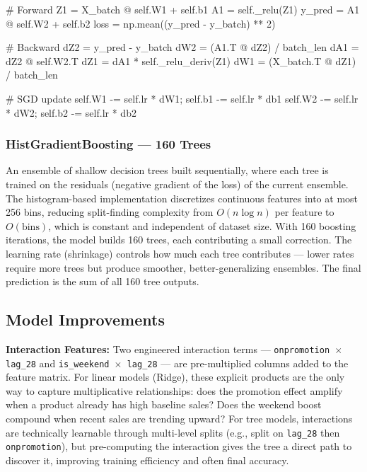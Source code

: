 \begin{pythoncode}[caption={MLP: forward pass, MSE loss, backward pass with ReLU derivative}]
# Forward
Z1 = X_batch @ self.W1 + self.b1
A1 = self._relu(Z1)
y_pred = A1 @ self.W2 + self.b2
loss = np.mean((y_pred - y_batch) ** 2)

# Backward
dZ2 = y_pred - y_batch
dW2 = (A1.T @ dZ2) / batch_len
dA1 = dZ2 @ self.W2.T
dZ1 = dA1 * self._relu_deriv(Z1)
dW1 = (X_batch.T @ dZ1) / batch_len

# SGD update
self.W1 -= self.lr * dW1;  self.b1 -= self.lr * db1
self.W2 -= self.lr * dW2;  self.b2 -= self.lr * db2
\end{pythoncode}

\subsubsection{HistGradientBoosting — 160 Trees}
An ensemble of shallow decision trees built sequentially, where each tree is trained on the residuals (negative gradient of the loss) of the current ensemble. The histogram-based implementation discretizes continuous features into at most 256 bins, reducing split-finding complexity from $O(n \log n)$ per feature to $O(\text{bins})$, which is constant and independent of dataset size. With 160 boosting iterations, the model builds 160 trees, each contributing a small correction. The learning rate (shrinkage) controls how much each tree contributes — lower rates require more trees but produce smoother, better-generalizing ensembles. The final prediction is the sum of all 160 tree outputs.

\subsection{Model Improvements}

\textbf{Interaction Features:} Two engineered interaction terms — \texttt{onpromotion $\times$ lag\_28} and \texttt{is\_weekend $\times$ lag\_28} — are pre-multiplied columns added to the feature matrix. For linear models (Ridge), these explicit products are the only way to capture multiplicative relationships: does the promotion effect amplify when a product already has high baseline sales? Does the weekend boost compound when recent sales are trending upward? For tree models, interactions are technically learnable through multi-level splits (e.g., split on \texttt{lag\_28} then \texttt{onpromotion}), but pre-computing the interaction gives the tree a direct path to discover it, improving training efficiency and often final accuracy.

